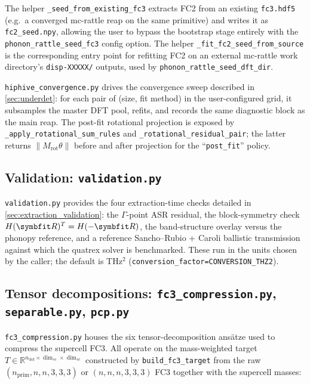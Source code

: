 The helper \texttt{\_seed\_from\_existing\_fc3} extracts FC2 from an
existing \texttt{fc3.hdf5} (e.g.\ a converged mc-rattle reap on the
same primitive) and writes it as \texttt{fc2\_seed.npy}, allowing the
user to bypass the bootstrap stage entirely with the
\texttt{phonon\_rattle\_seed\_fc3} config option.  The helper
\texttt{\_fit\_fc2\_seed\_from\_source} is the corresponding entry
point for refitting FC2 on an external mc-rattle work directory's
\texttt{disp-XXXXX/} outputs, used by
\texttt{phonon\_rattle\_seed\_dft\_dir}.

\texttt{hiphive\_convergence.py} drives the convergence sweep
described in \cref{sec:underdet}: for each pair of (size, fit method)
in the user-configured grid, it subsamples the master DFT pool,
refits, and records the same diagnostic block as the main reap.  The
post-fit rotational projection is exposed by
\texttt{\_apply\_rotational\_sum\_rules} and
\texttt{\_rotational\_residual\_pair}; the latter returns
$\|M_\mathrm{rot}\theta\|$ before and after projection for the
``\texttt{post\_fit}'' policy.

\subsection{Validation: \texttt{validation.py}}
\label{sec:validation}

\texttt{validation.py} provides the four extraction-time checks
detailed in \cref{sec:extraction_validation}: the $\Gamma$-point ASR
residual, the block-symmetry check $H(\vc{R})^T = H(-\vc{R})$, the
band-structure overlay versus the phonopy reference, and a reference
Sancho--Rubio + Caroli ballistic transmission against which the
quatrex solver is benchmarked.  These run in the units chosen by the
caller; the default is THz$^2$ (\texttt{conversion\_factor=CONVERSION\_THZ2}).

\subsection{Tensor decompositions: \texttt{fc3\_compression.py}, \texttt{separable.py}, \texttt{pcp.py}}
\label{sec:fc3_compression}

\texttt{fc3\_compression.py} houses the six tensor-decomposition
ansätze used to compress the supercell FC3.  All operate on the
mass-weighted target $T \in \mathbb{R}^{n_\mathrm{dof}\times \dim_{sc}\times \dim_{sc}}$
constructed by \texttt{build\_fc3\_target} from the raw
$(n_{\mathrm{prim}}, n, n, 3, 3, 3)$ or $(n, n, n, 3, 3, 3)$ FC3
together with the supercell masses:


